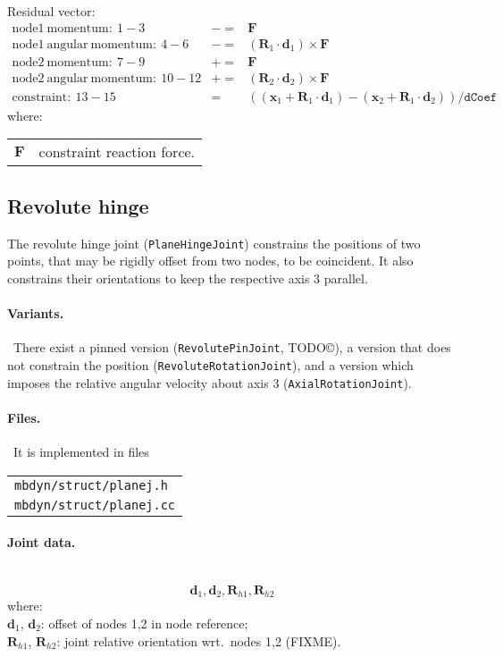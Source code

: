 \documentclass[10pt,fleqn,subeqn]{report}
\newcommand{\T}[1]{\bm{#1}}
\begin{document}
\noindent
Residual vector:
\begin{eqnarray*}
	\mathrm{node1\ momentum}:\ 1-3& -= & \T F \\
	\mathrm{node1\ angular\ momentum}:\ 4-6& -= & 
		(\T R_1\cdot \T d_1) \times \T F \\
	\mathrm{node2\ momentum}:\ 7-9& += & \T F \\
	\mathrm{node2\ angular\ momentum}:\ 10-12& += & 
		(\T R_2\cdot \T d_2) \times \T F \\
	\mathrm{constraint}:\ 13-15& = &  ((\T x_1+\T R_1\cdot \T d_1) - 
			(\T x_2+\T R_1\cdot \T d_2))/\texttt{dCoef}
\end{eqnarray*}
where:

\noindent
\begin{tabular}{ll}
$\T{F}$ & constraint reaction force.
\end{tabular}



\subsection{Revolute hinge}
The revolute hinge joint (\texttt{PlaneHingeJoint}) constrains the positions 
of two points, that may be rigidly offset from two nodes, 
to be coincident.
It also constrains their orientations to keep the respective axis 3 
parallel.

\paragraph{Variants.} \
There exist a pinned version (\texttt{RevolutePinJoint}, TODO\copyright),
a version that does not constrain the position (\texttt{RevoluteRotationJoint}),
and a version which imposes the relative angular velocity about axis 3
(\texttt{AxialRotationJoint}).

\paragraph{Files.} \
It is implemented in files

\begin{tabular}{l}
\texttt{mbdyn/struct/planej.h} \\
\texttt{mbdyn/struct/planej.cc}
\end{tabular}

\paragraph{Joint data.} \
\begin{equation}
\T d_1, \T d_2, \T R_{h1}, \T R_{h2}
\end{equation}
where:\\
$\T d_1$, $\T d_2$: offset of nodes 1,2 in node reference;\\
$\T R_{h1}$, $\T R_{h2}$: joint relative orientation wrt.\ nodes 1,2 (FIXME).\\
\end{document}
